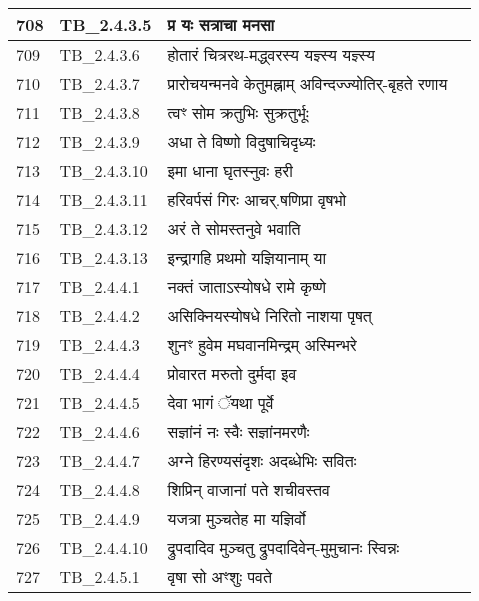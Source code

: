 \documentclass[17pt]{extarticle}
\begin{document}
\begin{longtable}{||p{0.4in}||p{0.9in}||p{4.0in}||p{0.9in}||}
        \hline
            708 & TB\_2.4.3.5 & प्र यः सत्राचा मनसा &      \\
        \hline
            709 & TB\_2.4.3.6 & होतारं चित्ररथ{-}मद्ध्वरस्य यज्ञ्स्य यज्ञ्स्य &      \\
        \hline
            710 & TB\_2.4.3.7 & प्रारोचयन्मनवे केतुमह्नाम् अविन्दज्ज्योतिर्{-}बृहते रणाय &      \\
        \hline
            711 & TB\_2.4.3.8 & त्वꣳ सोम क्रतुभिः सुक्रतुर्भूः &      \\
        \hline
            712 & TB\_2.4.3.9 & अधा ते विष्णो विदुषाचिदृध्यः &      \\
        \hline
            713 & TB\_2.4.3.10 & इमा धाना घृतस्नुवः हरी &      \\
        \hline
            714 & TB\_2.4.3.11 & हरिवर्पसं गिरः आचर्.षणिप्रा वृषभो &      \\
        \hline
            715 & TB\_2.4.3.12 & अरं ते सोमस्तनुवे भवाति &      \\
        \hline
            716 & TB\_2.4.3.13 & इन्द्रागहि प्रथमो यज्ञियानाम् या &      \\
        \hline
            717 & TB\_2.4.4.1 & नक्तं जाताऽस्योषधे रामे कृष्णे &      \\
        \hline
            718 & TB\_2.4.4.2 & असिक्नियस्योषधे निरितो नाशया पृषत् &      \\
        \hline
            719 & TB\_2.4.4.3 & शुनꣳ हुवेम मघवानमिन्द्रम् अस्मिन्भरे &      \\
        \hline
            720 & TB\_2.4.4.4 & प्रोवारत मरुतो दुर्मदा इव &      \\
        \hline
            721 & TB\_2.4.4.5 & देवा भागं ॅयथा पूर्वे &      \\
        \hline
            722 & TB\_2.4.4.6 & सज्ञांनं नः स्वैः सज्ञांनमरणैः &      \\
        \hline
            723 & TB\_2.4.4.7 & अग्ने हिरण्यसंदृशः अदब्धेभिः सवितः &      \\
        \hline
            724 & TB\_2.4.4.8 & शिप्रिन् वाजानां पते शचीवस्तव &      \\
        \hline
            725 & TB\_2.4.4.9 & यजत्रा मुञ्चतेह मा यज्ञिर्वो &      \\
        \hline
            726 & TB\_2.4.4.10 & द्रुपदादिव मुञ्चतु द्रुपदादिवेन्{-}मुमुचानः स्विन्नः &      \\
        \hline
            727 & TB\_2.4.5.1 & वृषा सो अꣳशुः पवते &      \\
        \hline

\end{longtable}
\end{document}
